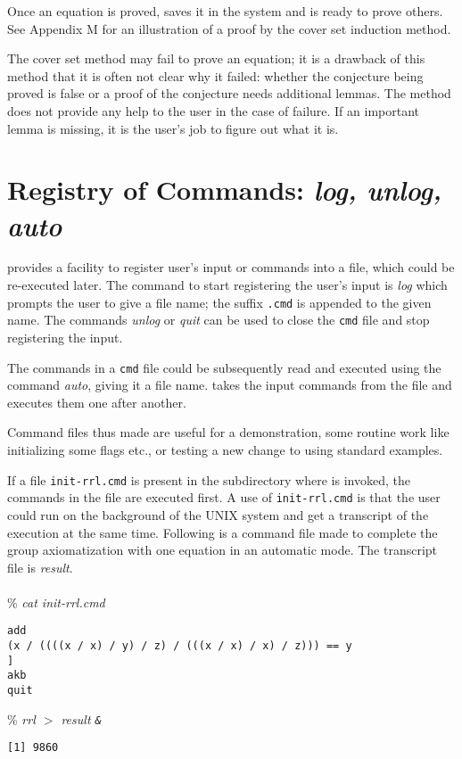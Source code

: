 Once an equation is proved, \RRL saves it in the system and is ready
to prove others. See Appendix M for an illustration of 
a proof by the cover set induction method.

The cover set method 
may fail to prove an equation;
it is a drawback of this method that
it is often not clear why it failed: whether the conjecture being proved is
false or a proof of the conjecture needs additional lemmas.  
The method does not provide any help to the user in the case of failure.
If an important lemma is missing, it is the user's job to figure out
what it is.

\section{Registry of Commands: {\em log, unlog, auto}}

\RRL provides a facility to register user's input or commands into a file, 
which
could be re-executed later.  The command to start registering the user's input
is {\em log} which prompts the user to give a file
name; the suffix {\tt .cmd} is appended to the given name. The
commands {\em unlog} or {\em quit} can be used to close the {\tt cmd} file
and stop registering the input.
  
The commands in a {\tt cmd} file could be 
subsequently read and executed using the command
{\em auto}, giving it a file name.  \RRL takes the input commands from
the file and executes them one after another.
  
Command files thus made are useful for a demonstration, some routine work
like initializing some flags etc., or testing a new change to \RRL using
standard examples.
  
If a file {\tt init-rrl.cmd} is present in the subdirectory where \RRL
is invoked, the commands in the file are executed first.  A use
of {\tt init-rrl.cmd} is that the user could run \RRL on the background
of the UNIX system and get a transcript of the execution at the same
time. Following is a command file made to complete the group
axiomatization with one equation in an automatic mode. The transcript
file is {\em result}.\\ 
\\
\% {\em cat init-rrl.cmd}
\begin{verbatim}
add
(x / ((((x / x) / y) / z) / (((x / x) / x) / z))) == y  
]
akb
quit
\end{verbatim}
\% {\em rrl $>$ result \tt \&}
\begin{verbatim}
[1] 9860
\end{verbatim}

